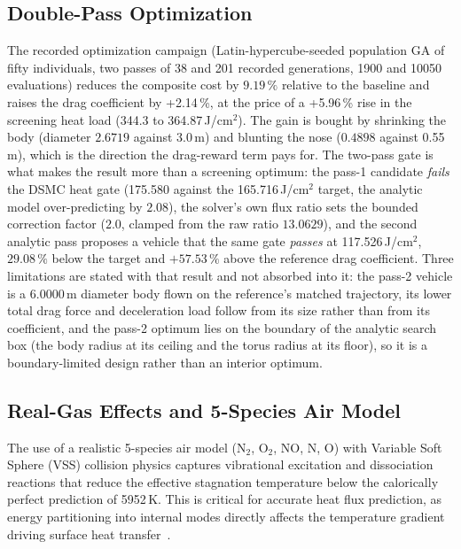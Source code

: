 \subsection{Double-Pass Optimization}
The recorded optimization campaign (Latin-hypercube-seeded population GA of fifty individuals, two passes of 38 and 201 recorded generations, 1900 and 10050 evaluations) reduces the composite cost by $9.19\,\%$ relative to the baseline and raises the drag coefficient by +2.14\,\%, at the price of a +5.96\,\% rise in the screening heat load (344.3 to 364.87\,J/cm$^2$). The gain is bought by shrinking the body (diameter $2.6719$ against 3.0\,m) and blunting the nose ($0.4898$ against 0.55\,m), which is the direction the drag-reward term pays for. The two-pass gate is what makes the result more than a screening optimum: the pass-1 candidate \emph{{fails}} the DSMC heat gate (175.580 against the 165.716\,J/cm$^2$ target, the analytic model over-predicting by $2.08$), the solver's own flux ratio sets the bounded correction factor ($2.0$, clamped from the raw ratio $13.0629$), and the second analytic pass proposes a vehicle that the same gate \emph{{passes}} at 117.526\,J/cm$^2$, $29.08\,\%$ below the target and $+57.53\,\%$ above the reference drag coefficient. Three limitations are stated with that result and not absorbed into it: the pass-2 vehicle is a $6.0000$\,m diameter body flown on the reference's matched trajectory, its lower total drag force and deceleration load follow from its size rather than from its coefficient, and the pass-2 optimum lies on the boundary of the analytic search box (the body radius at its ceiling and the torus radius at its floor), so it is a boundary-limited design rather than an interior optimum.

\subsection{Real-Gas Effects and 5-Species Air Model}
The use of a realistic 5-species air model (N$_2$, O$_2$, NO, N, O) with Variable Soft Sphere (VSS) collision physics captures vibrational excitation and dissociation reactions that reduce the effective stagnation temperature below the calorically perfect prediction of 5952\,K. This is critical for accurate heat flux prediction, as energy partitioning into internal modes directly affects the temperature gradient driving surface heat transfer~\cite{AndersonHypersonic}.

